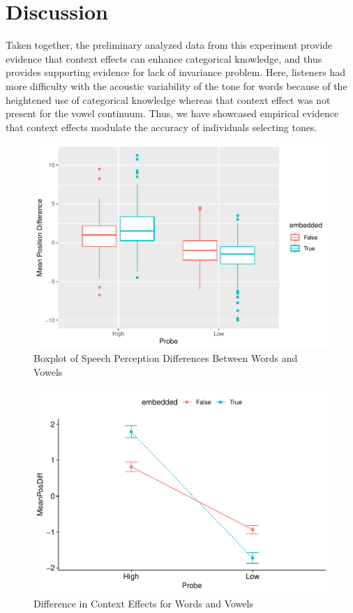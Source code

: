 \documentclass[
  man,floatsintext]{apa6}
\begin{document}
\hypertarget{discussion}{%
\section{Discussion}\label{discussion}}

Taken together, the preliminary analyzed data from this experiment provide evidence that context effects can enhance categorical knowledge, and thus provides supporting evidence for lack of invariance problem. Here, listeners had more difficulty with the acoustic variability of the tone for words because of the heightened use of categorical knowledge whereas that context effect was not present for the vowel continuum. Thus, we have showcased empirical evidence that context effects modulate the accuracy of individuals selecting tones.



\begin{figure}
\centering
\includegraphics{FinalScientificReport_files/figure-latex/GGPlotBoxplot-1.pdf}
\caption{\label{fig:GGPlotBoxplot}Boxplot of Speech Perception Differences Between Words and Vowels}
\end{figure}



\begin{figure}
\centering
\includegraphics{FinalScientificReport_files/figure-latex/GGPlotLine-1.pdf}
\caption{\label{fig:GGPlotLine}Difference in Context Effects for Words and Vowels}
\end{figure}
\end{document}
